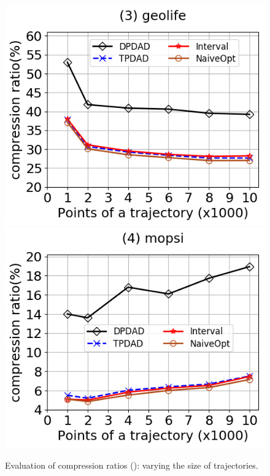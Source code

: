 \begin{figure}[tb!]
	\includegraphics[scale=0.315]{Figures/Exp-DAD-CR-size-geolife.png}	\hspace{1ex}
	\includegraphics[scale=0.315]{Figures/Exp-DAD-CR-size-mopsi.png}		
	\vspace{-3ex}
	\caption{\small Evaluation of compression ratios (\dad): varying the size of trajectories.}\label{fig:time-size-sed}
	\label{fig:cr-dad-size}
	\vspace{-3ex}
\end{figure}



